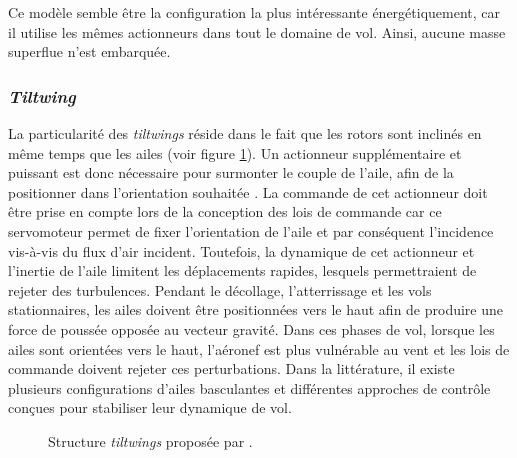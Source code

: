  
        Ce modèle semble être la configuration la plus intéressante énergétiquement, car il utilise les mêmes actionneurs dans tout le domaine de vol. Ainsi, aucune masse superflue n'est embarquée.

    
        \subsubsection*{\textit{Tiltwing}} 
        La particularité des \textit{tiltwings} réside dans le fait que les rotors sont inclinés en même temps que les ailes (voir figure \ref{fig:tiltwing}). Un actionneur supplémentaire et puissant est donc nécessaire pour surmonter le couple de l'aile, afin de la positionner dans l'orientation souhaitée \cite{holsten2011design, rohr2019attitude, ccetinsoy2012design}. La commande de cet actionneur doit être prise en compte lors de la conception des lois de commande car ce servomoteur permet de fixer l'orientation de l'aile et par conséquent l'incidence vis-à-vis du flux d'air incident. Toutefois, la dynamique de cet actionneur et l'inertie de l'aile limitent les déplacements rapides, lesquels permettraient de rejeter des turbulences. Pendant le décollage, l'atterrissage et les vols stationnaires, les ailes doivent être positionnées vers le haut afin de produire une force de poussée opposée au vecteur gravité. Dans ces phases de vol, lorsque les ailes sont orientées vers le haut, l'aéronef est plus vulnérable au vent et les lois de commande doivent rejeter ces perturbations. Dans la littérature, il existe plusieurs configurations d'ailes basculantes et différentes approches de contrôle conçues pour stabiliser leur dynamique de vol.
        \begin{figure}[ht!]
            \centering
            \caption{Structure \textit{tiltwings}  proposée par \cite{Aero2_2024, Ostermann2012ControlCO}.}
            \label{fig:tiltwing}
        \end{figure}

